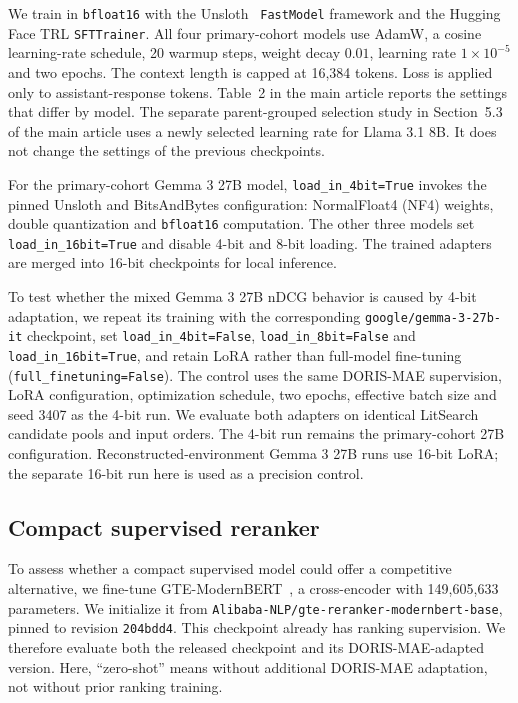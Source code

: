\documentclass[pdflatex,sn-basic,Numbered]{sn-jnl}%
\theoremstyle{thmstyleone}%
\theoremstyle{thmstyletwo}%
\theoremstyle{thmstylethree}%
\begin{document}
We train in \texttt{bfloat16} with the Unsloth~\cite{unsloth}
\texttt{FastModel} framework and the Hugging Face TRL \texttt{SFTTrainer}. All
four primary-cohort models use AdamW, a cosine learning-rate schedule,
20 warmup steps, weight
decay $0.01$, learning rate $1 \times 10^{-5}$ and two epochs. The context length
is capped at 16,384 tokens. Loss is applied only to assistant-response tokens.
Table~2 in the main article reports the settings that differ by model.
The separate parent-grouped selection study in
Section~5.3 of the main article uses a newly selected learning rate for Llama 3.1
8B. It does not change the settings of the previous checkpoints.

For the primary-cohort Gemma 3 27B model, \texttt{load\_in\_4bit=True} invokes the pinned Unsloth and
BitsAndBytes configuration: NormalFloat4 (NF4) weights, double quantization and
\texttt{bfloat16} computation. The other three models set
\texttt{load\_in\_16bit=True} and disable 4-bit and 8-bit loading. The trained
adapters are merged into 16-bit checkpoints for local inference.

To test whether the mixed Gemma 3 27B nDCG behavior is caused by 4-bit
adaptation, we repeat its training with the corresponding
\texttt{google/gemma-3-27b-it} checkpoint, set
\texttt{load\_in\_4bit=False}, \texttt{load\_in\_8bit=False} and
\texttt{load\_in\_16bit=True}, and retain LoRA rather than full-model
fine-tuning (\texttt{full\_finetuning=False}). The control uses the same
DORIS-MAE supervision, LoRA configuration, optimization schedule, two epochs,
effective batch size and seed 3407 as the 4-bit run. We evaluate both adapters
on identical LitSearch candidate pools and input orders. The 4-bit run remains
the primary-cohort 27B configuration. Reconstructed-environment Gemma 3 27B
runs use 16-bit LoRA; the separate 16-bit run here is used as a precision control.

\subsection{Compact supervised reranker}
\label{sec:compact-training}

To assess whether a compact supervised model could offer a competitive alternative,
we fine-tune GTE-ModernBERT~\cite{gte-modernbert}, a cross-encoder with
149,605,633 parameters. We initialize it from
\texttt{Alibaba-NLP/gte-reranker-modernbert-base}, pinned to revision
\texttt{204bdd4}. This checkpoint already has ranking supervision. We therefore
evaluate both the released checkpoint and its DORIS-MAE-adapted version. Here,
``zero-shot'' means without additional DORIS-MAE adaptation, not without prior
ranking training.
\end{document}
